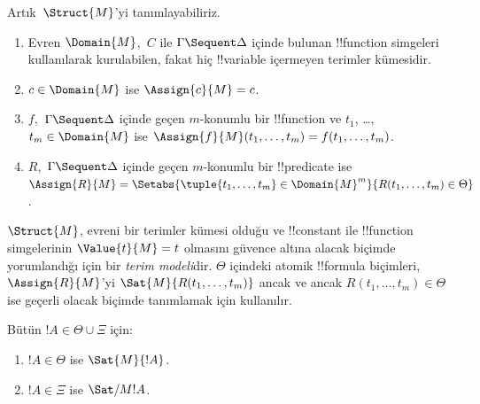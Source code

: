 \documentclass[../../../include/open-logic-section]{subfiles}
\begin{document}
Artık~$\Struct{M}$'yi tanımlayabiliriz.
\begin{enumerate}
\item Evren $\Domain{M}$,~$C$ ile $\Gamma \Sequent \Delta$ içinde bulunan
!!{function} simgeleri kullanılarak kurulabilen, fakat hiç !!{variable} içermeyen
terimler kümesidir.
\item $c \in \Domain{M}$ ise $\Assign{c}{M} = c$.
\item $f$,~$\Gamma \Sequent \Delta$ içinde geçen $m$-konumlu bir
!!{function} ve $t_1$, \dots, $t_m \in \Domain{M}$ ise
$\Assign{f}{M}(t_1, \dots, t_m) = f(t_1, \dots, t_m)$.
\item $R$,~$\Gamma \Sequent \Delta$ içinde geçen $m$-konumlu bir
!!{predicate} ise $\Assign{R}{M} = \Setabs{\tuple{t_1, \dots, t_m} \in
\Domain{M}^m}{R(t_1, \dots, t_m) \in \Theta}$.
\end{enumerate}
$\Struct{M}$, evreni bir terimler kümesi olduğu ve !!{constant} ile
!!{function} simgelerinin $\Value{t}{M} = t$ olmasını güvence altına alacak biçimde
yorumlandığı için bir \emph{terim modeli}dir. $\Theta$ içindeki atomik
!!{formula} biçimleri, $\Assign{R}{M}$'yi $\Sat{M}{R(t_1, \dots, t_m)}$ ancak ve
ancak $R(t_1, \dots, t_m) \in \Theta$ ise geçerli olacak biçimde tanımlamak
için kullanılır.

\begin{lem}
Bütün $!A \in \Theta \cup \Xi$ için:
\begin{enumerate}
  \item $!A \in \Theta$ ise $\Sat{M}{!A}$.
  \item $!A \in \Xi$ ise $\Sat/{M}{!A}$.
\end{enumerate}
\end{lem}
\end{document}
